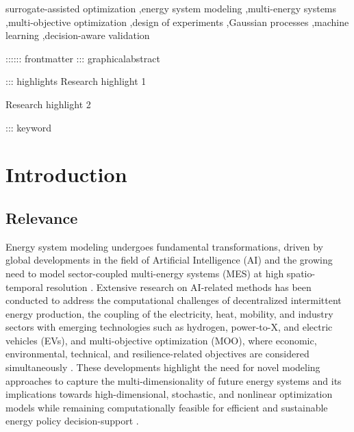 \documentclass[final,5p,times,twocolumn]{elsarticle}
\begin{document}
\begin{frontmatter}
\begin{keyword}
surrogate-assisted optimization \sep energy system modeling \sep multi-energy systems \sep multi-objective optimization \sep design of experiments \sep Gaussian processes \sep machine learning \sep decision-aware validation
\end{keyword}

\end{frontmatter}

﻿:::::: frontmatter
::: graphicalabstract

::: highlights
Research highlight 1

Research highlight 2

::: keyword

\section{Introduction}
\label{sec:introduction}
\subsection{Relevance}
\label{sec:intro:relevance}

Energy system modeling undergoes fundamental transformations, driven by
global developments in the field of Artificial Intelligence (AI) and the
growing need to model sector-coupled multi-energy systems (MES) at high
spatio-temporal resolution \cite{Klemm2021,Lim2025}.
Extensive research on AI-related methods has
been conducted to address the computational challenges of decentralized
intermittent energy production, the coupling of the electricity, heat,
mobility, and industry sectors with emerging technologies such as
hydrogen, power-to-X, and electric vehicles (EVs), and multi-objective
optimization (MOO), where economic, environmental, technical, and
resilience-related objectives are considered simultaneously
\cite{Zhou20181,Zheng20231907,Ren2024,Dong2023,Yin2024}. These
developments highlight the need for novel modeling approaches to capture
the multi-dimensionality of future energy systems and its implications
towards high-dimensional, stochastic, and nonlinear optimization models
while remaining computationally feasible for efficient and sustainable
energy policy decision-support \cite{Ruan2021221,Perera2019191,Khaloie2025,Mylonopoulos202332697}.
\end{document}
